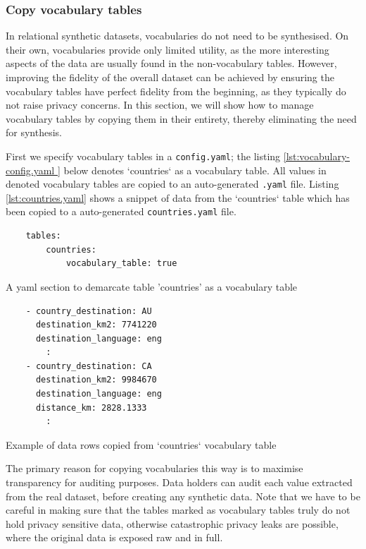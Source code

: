\documentclass[11pt]{article}
\begin{document}
\subsubsection{Copy vocabulary tables}

In relational synthetic datasets, vocabularies do not need to be synthesised. On their own, vocabularies provide only limited utility, as the more interesting aspects of the data are usually found in the non-vocabulary tables. However, improving the fidelity of the overall dataset can be achieved by ensuring the vocabulary tables have perfect fidelity from the beginning, as they typically do not raise privacy concerns. In this section, we will show how to manage vocabulary tables by copying them in their entirety, thereby eliminating the need for synthesis.

First we specify vocabulary tables in a \texttt{config.yaml}; the listing \ref{lst:vocabulary-config.yaml } below denotes `countries` as a vocabulary table. All values in denoted vocabulary tables are copied to an auto-generated \texttt{.yaml} file. Listing \ref{lst:countries.yaml} shows a snippet of data from the `countries` table which has been copied to a auto-generated \texttt{countries.yaml} file.

\begin{listing}[H]
\begin{verbatim}
    tables:
        countries:
            vocabulary_table: true
\end{verbatim}
\caption{A yaml section to demarcate table 'countries' as a vocabulary table}
\label{lst:vocabulary-config.yaml }
\end{listing}

\begin{listing}[H]
\begin{verbatim}
    - country_destination: AU
      destination_km2: 7741220
      destination_language: eng
        :
    - country_destination: CA
      destination_km2: 9984670
      destination_language: eng
      distance_km: 2828.1333
        :
\end{verbatim}
\caption{Example of data rows copied from `countries` vocabulary table}
\label{lst:countries.yaml}
\end{listing}

The primary reason for copying vocabularies this way is to maximise transparency for auditing purposes. Data holders can audit each value extracted from the real dataset, before creating any synthetic data. Note that we have to be careful in making sure that the tables marked as vocabulary tables truly do not hold privacy sensitive data, otherwise catastrophic privacy leaks are possible, where the original data is exposed raw and in full. 
\end{document}
